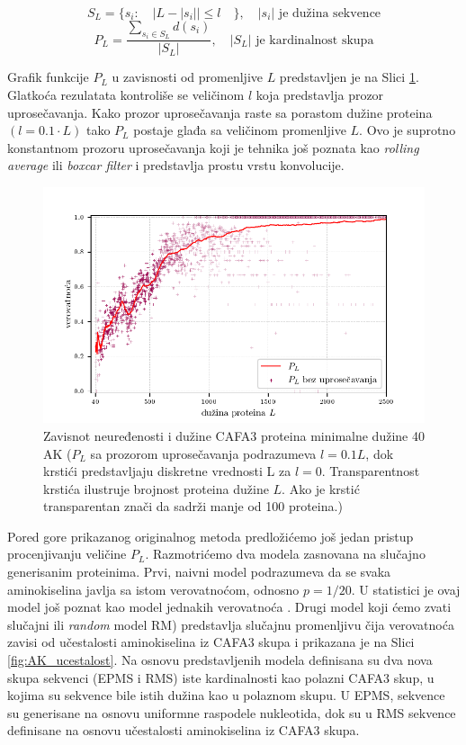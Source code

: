 $$ S_L = \{s_i : \quad | L -  | s_i | | \le l \quad \}, \quad   |s_i| \text{ je dužina sekvence}  $$
$$ P_L = \dfrac{ \sum_{s_i \in S_L} d(s_i)} {| S_L |}, \quad   |S_L| \text{ je kardinalnost skupa}$$

Grafik funkcije $P_L$ u zavisnosti od promenljive $L$ predstavljen je na Slici
\ref{fig:PL1}.  Glatkoća rezulatata kontroliše se veličinom $l$ koja
predstavlja prozor uprosečavanja. Kako prozor uprosečavanja raste sa porastom
dužine proteina $(l = 0.1 \cdot L)$ tako $P_L$ postaje glađa sa veličinom
promenljive $L$. Ovo je suprotno konstantnom prozoru uprosečavanja  koji je
tehnika još poznata kao \textit{rolling average} ili \textit{boxcar filter} i
predstavlja prostu vrstu konvolucije. 


\begin{figure}[th]
\centering
\includegraphics[]{plots/PL_F}
\caption {
  Zavisnot neuređenosti i dužine CAFA3 proteina minimalne dužine 40 AK
  \footnotesize
  ($P_L$ sa prozorom uprosečavanja podrazumeva $l = 0.1L$, dok
  krstići predstavljaju diskretne vrednosti L za $l = 0$. Transparentnost krstića
  ilustruje brojnost proteina dužine $L$. Ako je krstić transparentan
  znači da sadrži manje od 100 proteina.)
}
\label{fig:PL1}
\end{figure}


Pored gore prikazanog originalnog metoda predložićemo još jedan pristup
procenjivanju veličine $P_L$.
Razmotrićemo dva modela zasnovana na slučajno generisanim proteinima. Prvi,
naivni model  podrazumeva da se svaka
aminokiselina javlja sa istom verovatnoćom, odnosno $p=1/20$. U statistici je ovaj
model još poznat kao model jednakih verovatnoća .  Drugi model koji ćemo zvati slučajni ili \textit{random} model RM)  predstavlja
slučajnu promenljivu čija verovatnoća zavisi od učestalosti aminokiselina iz
CAFA3 skupa i prikazana je na Slici \ref{fig:AK_ucestalost}.
Na osnovu predstavljenih modela definisana su dva nova skupa sekvenci (EPMS i
RMS) iste kardinalnosti kao polazni CAFA3 skup, u kojima su sekvence bile istih
dužina kao u polaznom skupu. U EPMS, sekvence su generisane na osnovu uniformne
raspodele nukleotida, dok su u RMS sekvence definisane na osnovu učestalosti
aminokiselina iz CAFA3 skupa.


